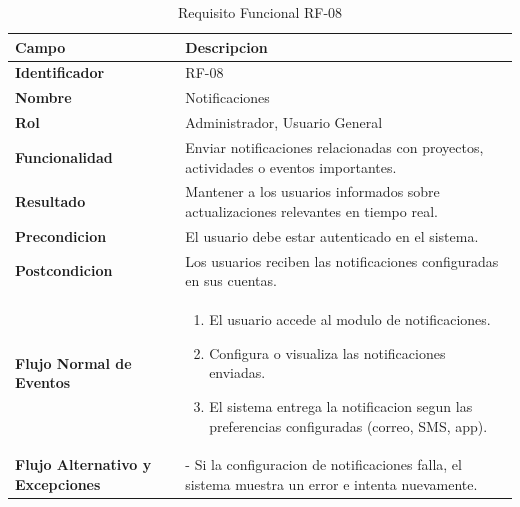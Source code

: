 \begin{table}[htb!]
\centering
\caption{Requisito Funcional RF-08}
\begin{tabular}{|p{3cm}|p{12cm}|}
\hline
\textbf{Campo} & \textbf{Descripcion} \\ \hline
\textbf{Identificador} & RF-08 \\ \hline
\textbf{Nombre} & Notificaciones \\ \hline
\textbf{Rol} & Administrador, Usuario General \\ \hline
\textbf{Funcionalidad} & Enviar notificaciones relacionadas con proyectos, actividades o eventos importantes. \\ \hline
\textbf{Resultado} & Mantener a los usuarios informados sobre actualizaciones relevantes en tiempo real. \\ \hline
\textbf{Precondicion} & El usuario debe estar autenticado en el sistema. \\ \hline
\textbf{Postcondicion} & Los usuarios reciben las notificaciones configuradas en sus cuentas. \\ \hline
\textbf{Flujo Normal de Eventos} & 
\begin{enumerate}
    \item El usuario accede al modulo de notificaciones. 
    \item Configura o visualiza las notificaciones enviadas. 
    \item El sistema entrega la notificacion segun las preferencias configuradas (correo, SMS, app). 
    
\end{enumerate}
\\ \hline
\textbf{Flujo Alternativo y Excepciones} & 
- Si la configuracion de notificaciones falla, el sistema muestra un error e intenta nuevamente. \\ \hline
\end{tabular}
\end{table}
\FloatBarrier

